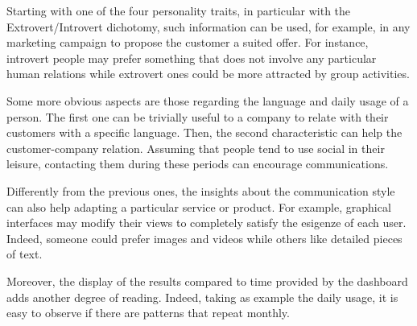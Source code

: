 Starting with one of the four personality traits, in particular with the Extrovert/Introvert dichotomy, such information can be used, for example, in any marketing campaign to propose the customer a suited offer. For instance, introvert people may prefer something that does not involve any particular human relations while extrovert ones could be more attracted by group activities.

Some more obvious aspects are those regarding the language and daily usage of a person. The first one can be trivially useful to a company to relate with their customers with a specific language.
Then, the second characteristic can help the customer-company relation. Assuming that people tend to use social in their leisure, contacting them during these periods can encourage communications.

Differently from the previous ones, the insights about the communication style can also help adapting a particular service or product. For example, graphical interfaces may modify their views to completely satisfy the esigenze of each user. Indeed, someone could prefer images and videos while others like detailed pieces of text.

Moreover, the display of the results compared to time provided by the dashboard adds another degree of reading.
Indeed, taking as example the daily usage, it is easy to observe if there are patterns that repeat monthly.


